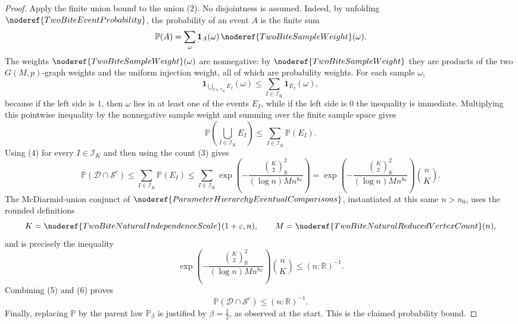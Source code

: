 \begin{proof}
Apply the finite union bound to the union (2).  No disjointness is assumed.
Indeed, by unfolding \(\noderef{TwoBiteEventProbability}\), the probability
of an event \(A\) is the finite sum
\[
\mathbb P(A)=
\sum_{\omega}
\mathbf 1_A(\omega)\,\noderef{TwoBiteSampleWeight}(\omega).
\]
The weights \(\noderef{TwoBiteSampleWeight}(\omega)\) are nonnegative: by
\(\noderef{TwoBiteSampleWeight}\) they are products of the two
\(G(M,p)\)-graph weights and the uniform injection weight, all of which are
probability weights.  For each sample \(\omega\),
\[
\mathbf 1_{\bigcup_{I\in\mathcal I_K}E_I}(\omega)
\le \sum_{I\in\mathcal I_K}\mathbf 1_{E_I}(\omega),
\]
because if the left side is \(1\), then \(\omega\) lies in at least one of the
events \(E_I\), while if the left side is \(0\) the inequality is immediate.
Multiplying this pointwise inequality by the nonnegative sample weight and
summing over the finite sample space gives
\[
\mathbb P\!\left(\bigcup_{I\in\mathcal I_K}E_I\right)
\le \sum_{I\in\mathcal I_K}\mathbb P(E_I).
\]
Using (4) for every \(I\in\mathcal I_K\) and then using the count (3) gives
\[
\mathbb P(\mathcal D\cap\mathcal S^{c})
\le
\sum_{I\in\mathcal I_K}\mathbb P(E_I)
\le
\sum_{I\in\mathcal I_K}
\exp\!\left(
-\frac{\binom{K}{2}_{\mathbb R}^2}
 {(\log n)M n^{8\varepsilon}}
\right)
=
\exp\!\left(
-\frac{\binom{K}{2}_{\mathbb R}^2}
 {(\log n)M n^{8\varepsilon}}
\right)\binom{n}{K}. \tag{5}
\]
The McDiarmid-union conjunct of
\(\noderef{ParameterHierarchyEventualComparisons}\), instantiated at this
same \(n>n_0\), uses the rounded definitions
\[
K=\noderef{TwoBiteNaturalIndependenceScale}(1+\varepsilon,n),
\qquad
M=\noderef{TwoBiteNaturalReducedVertexCount}(n),
\]
and is precisely the inequality
\[
\exp\!\left(
-\frac{\binom{K}{2}_{\mathbb R}^2}
 {(\log n)M n^{8\varepsilon}}
\right)
\binom{n}{K}\le (n:\mathbb R)^{-1}. \tag{6}
\]
Combining (5) and (6) proves
\[
\mathbb P(\mathcal D\cap\mathcal S^{c})\le(n:\mathbb R)^{-1}.
\]
Finally, replacing \(\mathbb P\) by the parent law
\(\mathbb P_\beta\) is justified by \(\beta=\frac12\), as observed at the
start.  This is the claimed probability bound.
\end{proof}

